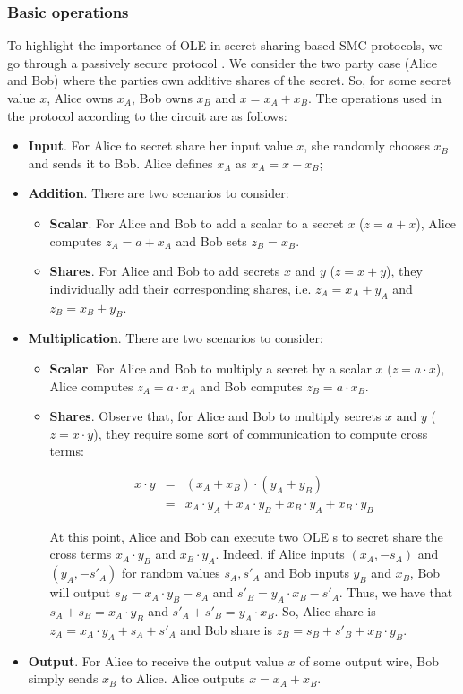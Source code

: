 \subsubsection{Basic operations}

To highlight the importance of OLE in secret sharing based SMC protocols, we go through a passively secure protocol \cite{Evans2018}. We consider the two party case (Alice and Bob) where the parties own additive shares of the secret. So, for some secret value $x$, Alice owns $x_A$, Bob owns $x_B$ and $x = x_A + x_B$. The operations used in the protocol according to the circuit are as follows:

\begin{itemize}
	\item \textbf{Input}. For Alice to secret share her input value $x$, she randomly chooses $x_B$ and sends it to Bob. Alice defines $x_A$ as $x_A = x - x_B$;
	\item \textbf{Addition}. There are two scenarios to consider:
	\begin{itemize}
		\item \textbf{Scalar}. For Alice and Bob to add a scalar to a secret $x$ ($z = a + x$), Alice computes $z_A = a + x_A$ and Bob sets $z_B = x_B$.
		\item \textbf{Shares}. For Alice and Bob to add secrets $x$ and $y$ ($z = x+y$), they individually add their corresponding shares, i.e. $z_A = x_A + y_A$ and $z_B = x_B + y_B$.
	\end{itemize}
	\item \textbf{Multiplication}. There are two scenarios to consider:
		\begin{itemize}
		\item \textbf{Scalar}. For Alice and Bob to multiply a secret by a scalar $x$ ($z = a \cdot x$), Alice computes $z_A = a \cdot x_A$ and Bob computes $z_B = a \cdot x_B$.
		\item \textbf{Shares}. Observe that, for Alice and Bob to multiply secrets $x$ and $y$ ($z = x\cdot y$), they require some sort of communication to compute cross terms:
		
		\begin{eqnarray}
		x\cdot y &=& (x_A + x_B)\cdot (y_A + y_B)\\
		&=& x_A\cdot y_A + x_A\cdot y_B + x_B \cdot y_A + x_B\cdot y_B
		\end{eqnarray}
		
		At this point, Alice and Bob can execute two OLE s to secret share the cross terms $x_A\cdot y_B$ and $x_B \cdot y_A$. Indeed, if Alice inputs $(x_A, - s_A)$ and $(y_A, - s'_A)$ for random values $s_A, s'_A$ and Bob inputs $y_B$ and $x_B$, Bob will output $s_B = x_A \cdot y_B - s_A$ and $s'_B = y_A \cdot x_B - s'_A$. Thus, we have that $s_A + s_B = x_A \cdot y_B$ and $s'_A + s'_B = y_A \cdot x_B$. So, Alice share is $z_A = x_A\cdot y_A + s_A + s'_A$ and Bob share is $z_B =  s_B + s'_B + x_B\cdot y_B$.  
	\end{itemize}
	\item \textbf{Output}. For Alice to receive the output value $x$ of some output wire, Bob simply sends $x_B$ to Alice. Alice outputs $x = x_A + x_B$.
\end{itemize}


%
%
%
